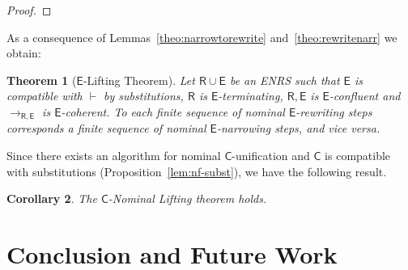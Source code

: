 \documentclass[submission,copyright,creativecommons]{eptcs}
\newcommand{\alert}[1]{\textcolor{red}{#1}}
\newcommand{\theory}[1]{\ensuremath{\mathsf{#1}}}
\theoremstyle{plain}
\newtheorem{theorem}{Theorem}[section]
\newtheorem{corollary}[theorem]{Corollary}
\theoremstyle{definition}
\theoremstyle{remark}
\begin{document}
\begin{proof}

\end{proof}
As a consequence of Lemmas~\ref{theo:narrowtorewrite} and~\ref{theo:rewritenarr} we obtain:
\begin{theorem}[$\theory{E}$-Lifting Theorem]\label{teo:Clifitng} 
Let $\theory{R}{\cup}\theory{E}$ be an ENRS such that \theory{E} is compatible with $\vdash$ by substitutions,  $\theory{R}$ is  \theory{E}-terminating, \theory{R,E} is \theory{E}-confluent and $\to_{\theory{R,E}}$ is $\theory{E}$-coherent.
To each finite sequence of nominal \theory{E}-rewriting steps corresponds a  finite sequence of nominal $\theory{E}$-narrowing steps, and vice versa.
\end{theorem}
Since there exists an algorithm for nominal \theory{C}-unification and \theory{C} is compatible with substitutions (Proposition~\ref{lem:nf-subst}), we have the following result.
\begin{corollary}
    The \theory{C}-Nominal Lifting theorem holds.
\end{corollary}

\section{Conclusion and Future Work}
\label{sect:future-work}
\end{document}
